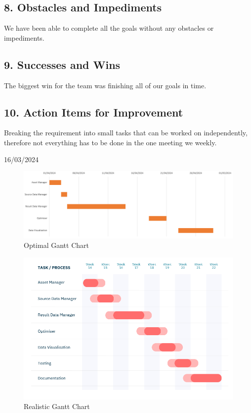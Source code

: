 \documentclass[12pt]{report}
\begin{document}
\subsection*{8. Obstacles and Impediments}
We have been able to complete all the goals without any obstacles or impediments.
\subsection*{9. Successes and Wins}
The biggest win for the team was finishing all of our goals in time.
\subsection*{10. Action Items for Improvement}
Breaking the requirement into small tasks that can be worked on independently, therefore not everything has to be done in the one meeting we weekly.

\hfill 16/03/2024


\begin{figure}[H]
  \centering
  \includegraphics[width=1\textwidth]{Resources/1-Sprint/Gantt-Chart-Optimal.png}
  \caption{Optimal Gantt Chart}
  \label{fig:OptGanttChart}
\end{figure}

\begin{figure}[H]
  \centering
  \includegraphics[width=1\textwidth]{Resources/1-Sprint/Gantt-Chart-Realistic.png}
  \caption{Realistic Gantt Chart}
  \label{fig:RealGanttChart}
\end{figure}
\end{document}
